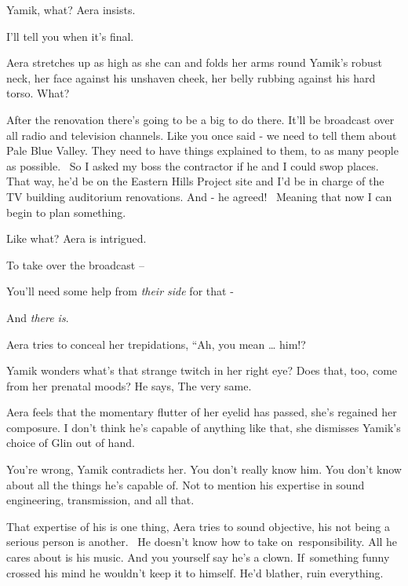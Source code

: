 \documentclass[letterpaper]{article}
\begin{document}
{\textquotedbl}Yamik, what?{\textquotedbl} Aera insists.

{\textquotedbl}I'll tell you when it's final.{\textquotedbl} 

Aera stretches up as high as she can and folds her arms round Yamik's robust neck, her face against his unshaven cheek,
her belly rubbing against his hard torso. {\textquotedbl}What?{\textquotedbl} 

{\textquotedbl}After the renovation there's going to be a big to do there. It'll be broadcast over all radio and
television channels. Like you once said - we need to tell them about Pale Blue Valley. They need to have things
explained to them, to as many people as possible. \ So I asked my boss the contractor if he and I could swop places.
That way, he'd be on the Eastern Hills Project site and I'd be in charge of the TV building auditorium renovations. And
- he agreed! \ Meaning that now I can begin to plan something.{\textquotedbl} 

{\textquotedbl}Like what?{\textquotedbl} Aera is intrigued. 

{\textquotedbl}To take over the broadcast --{\textquotedbl} 

{\textquotedbl}You'll need some help from \textit{their side }for that -{\textquotedbl} 

{\textquotedbl}And \textit{there is}.{\textquotedbl} 

Aera tries to conceal her trepidations, ``Ah, you mean {\dots} him!?{\textquotedbl} 

Yamik wonders what's that strange twitch in her right eye? Does that, too, come from her prenatal moods? He says,
{\textquotedbl}The very same.{\textquotedbl} 

Aera feels that the momentary flutter of her eyelid has passed, she's regained her composure. {\textquotedbl}I don't
think he's capable of anything like that,{\textquotedbl} she dismisses Yamik's choice of Glin out of hand. ~

{\textquotedbl}You're wrong,{\textquotedbl} Yamik contradicts her. {\textquotedbl}You don't really know him. You don't
know about all the things he's capable of. Not to mention his expertise in sound engineering, transmission, and all
that.{\textquotedbl} 

{\textquotedbl}That expertise of his is one thing,{\textquotedbl} Aera tries to sound objective, {\textquotedbl}his not
being a serious person is another. \ He doesn't know how to take on~responsibility. All he cares about is his music.
And you yourself say he's a clown. If~something funny crossed his mind he wouldn't keep it to himself. He'd blather,
ruin everything.{\textquotedbl} 
\end{document}
